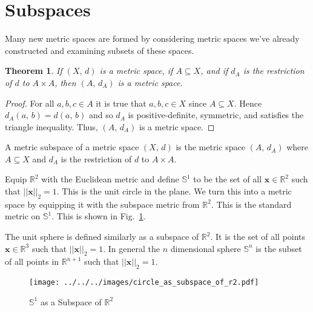 \documentclass{article}
\theoremstyle{plain}
\newtheorem{theorem}{Theorem}[section]
\theoremstyle{normal}
\newenvironment{example}{%
    \pushQED{\qed}\renewcommand{\qedsymbol}{$\blacksquare$}\examplex%
}{%
    \popQED\endexamplex%
}
\newenvironment{definition}{%
    \pushQED{\qed}\renewcommand{\qedsymbol}{$\blacksquare$}\definitionx%
}{%
    \popQED\enddefinitionx%
}
\begin{document}
    \section{Subspaces}
        Many new metric spaces are formed by considering metric spaces we've
        already constructed and examining subsets of these spaces.
        \begin{theorem}
            If $(X,\,d)$ is a metric space, if $A\subseteq{X}$, and if
            $d_{A}$ is the restriction of $d$ to $A\times{A}$, then
            $(A,\,d_{A})$ is a metric space.
        \end{theorem}
        \begin{proof}
            For all $a,b,c\in{A}$ it is true that $a,b,c\in{X}$ since
            $A\subseteq{X}$. Hence $d_{A}(a,\,b)=d(a,\,b)$ and so
            $d_{A}$ is positive-definite, symmetric, and satisfies the
            triangle inequality. Thus, $(A,\,d_{A})$ is a metric space.
        \end{proof}
        \begin{definition}[\textbf{Metric Subspace}]
            A metric subspace of a metric space $(X,\,d)$ is the metric space
            $(A,\,d_{A})$ where $A\subseteq{X}$ and $d_{A}$ is the restriction
            of $d$ to $A\times{A}$.
        \end{definition}
        \begin{example}
            Equip $\mathbb{R}^{2}$ with the Euclidean metric and define
            $\mathbb{S}^{1}$ to be the set of all $\mathbf{x}\in\mathbb{R}^{2}$
            such that $||\mathbf{x}||_{2}=1$. This is the unit circle in the
            plane. We turn this into a metric space by equipping it with the
            subspace metric from $\mathbb{R}^{2}$. This is the standard metric
            on $\mathbb{S}^{1}$. This is shown in
            Fig.~\ref{fig:circle_as_subspace_of_r2}.
        \end{example}
        \begin{example}
            The unit sphere is defined similarly as a subspace of
            $\mathbb{R}^{2}$. It is the set of all points
            $\mathbf{x}\in\mathbb{R}^{3}$ such that $||\mathbf{x}||_{2}=1$.
            In general the $n$ dimensional sphere $\mathbb{S}^{n}$ is the
            subset of all points in $\mathbb{R}^{n+1}$ such that
            $||\mathbf{x}||_{2}=1$.
        \end{example}
        \begin{figure}
            \centering
            \texttt{[image: ../../../images/circle\_as\_subspace\_of\_r2.pdf]}
            \caption{$\mathbb{S}^{1}$ as a Subspace of $\mathbb{R}^{2}$}
            \label{fig:circle_as_subspace_of_r2}
        \end{figure}
\end{document}
